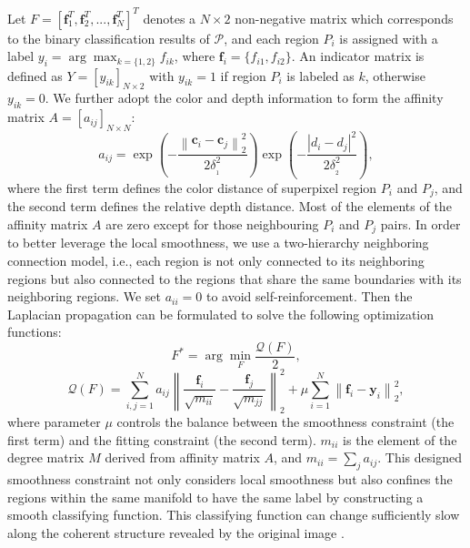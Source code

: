 \documentclass[journal]{IEEEtran}
\begin{document}
Let $F = {[\bm{f}_1^T,\bm{f}_2^T,...,\bm{f}_N^T]^T}$ denotes a $N\times2$ non-negative matrix which corresponds to the binary classification results of $\mathcal{P}$,
and each region $P_i$ is assigned with a label $y_i= \arg \max _{k= \{1, 2\}}f_{ik}$, where $\bm{f}_i = \{f_{i1},f_{i2}\}$. An indicator matrix is defined as $Y =  {[{y_{ik}}]_{N \times 2}}$ with $y_{ik}=1$ if region $P_i$ is labeled as $k$, otherwise $y_{ik} = 0$.
We further adopt the color and depth information to form the affinity matrix $A = {[{a_{ij}}]_{N \times N}}$:
\begin{equation}\label{w_ij}
  {a_{ij}} = \exp ( - \frac{{\left\| {{\bm{c}_{{i}}} - {\bm{c}_{{j}}}} \right\|_2^2}}{{2\delta _{_{1}}^2}})\exp ( - \frac{{\left| {{d_{{i}}} - {d_{{j}}}} \right|^2}}{{2\delta _{_{2}}^2}}),
\end{equation}
where the first term defines the color distance of superpixel region $P_i$ and $P_j$, and the second term defines the relative depth distance. Most of the elements of the affinity matrix $A$ are zero except for those neighbouring $P_i$ and $P_j$ pairs. In order to better leverage the local smoothness, we use a two-hierarchy neighboring connection model, i.e., each region is not only connected to its neighboring regions but also connected to the regions that share the same boundaries with its neighboring regions. We set $a_{ii} = 0$ to avoid self-reinforcement.
Then the Laplacian propagation can be formulated to solve the following optimization functions:
\begin{equation}\label{sal_optimization}
F^*=\arg\mathop {\min }\limits_F \frac{\mathcal{Q}(F)}{2},
\end{equation}
\begin{equation}\label{sal_optimization2}
\mathcal{Q}(F)=\sum\limits_{i,j = 1}^N {{a_{ij}}} {\left\| {\frac{{{\bm{f}_i}}}{{\sqrt {{m_{ii}}} }} - \frac{{{\bm{f}_j}}}{{\sqrt {{m_{jj}}} }}} \right\|_2^2} + \mu {\sum\limits_{i = 1}^N {\left\| {{\bm{f}_i} - {\bm{y}_i}} \right\|}_2 ^2},
\end{equation}
where parameter $\mu$ controls the balance between the smoothness constraint (the first term) and the fitting constraint (the second term). $m_{ii}$ is the element of the degree matrix $M$ derived from affinity matrix $A$, and $m_{ii} = \sum\limits_{j}{a_{ij}}$.
This designed smoothness constraint not only considers local smoothness but also confines the regions within the same manifold to have the same label by
constructing a smooth classifying function. This classifying function can change sufficiently slow along the coherent structure revealed by the original image \cite{zhou2004learning}.
\end{document}
